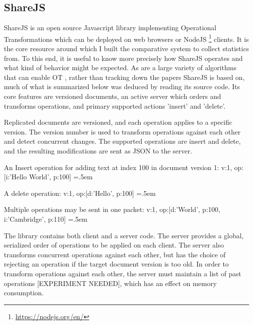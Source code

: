 \documentclass[12pt,a4paper,twoside,openright]{report}
\newenvironment{lcverbatim}
 {\SaveVerbatim{cverb}}
 {\endSaveVerbatim
  \flushleft\fboxrule=0pt\fboxsep=.5em
  \colorbox{cverbbg}{%
    \makebox[\dimexpr\linewidth-2\fboxsep][l]{\BUseVerbatim{cverb}}%
  }
  \endflushleft
}
\begin{document}
	\subsection{ShareJS}
	
	ShareJS \cite{sharejs} is an open source Javascript library implementing Operational Transformations which can be deployed on web browsers or NodeJS \footnote{\url{https://nodejs.org/en/}} clients. It is the core resource around which I built the comparative system to collect statistics from. To this end, it is useful to know more precisely how ShareJS operates and what kind of behavior might be expected. As are a large variety of algorithms that can enable OT \cite{kumawat2016}, rather than tracking down the papers ShareJS is based on, much of what is summarized below was deduced by reading its source code. Its core features are versioned documents, an active server which orders and transforms operations, and primary supported actions 'insert' and 'delete'.
	
	Replicated documents are versioned, and each operation applies to a specific version. The version number is used to transform operations against each other and detect concurrent changes. The supported operations are insert and delete, and the resulting modifications are sent as JSON to the server.
	
	An Insert operation for adding text at index 100 in document version 1:
\begin{lcverbatim}
{v:1, op:[{i:'Hello World', p:100}]}
\end{lcverbatim}

	A delete operation:
\begin{lcverbatim}
{v:1, op:[{d:'Hello', p:100}]}
\end{lcverbatim}

	Multiple operations may be sent in one packet:
\begin{lcverbatim}
{v:1, op:[{d:'World', p:100}, {i:'Cambridge', p:110}]}
\end{lcverbatim}

\vspace{5mm}

	The library contains both client and a server code. The server provides a global, serialized order of operations to be applied on each client. The server also transforms concurrent operations against each other, but has the choice of rejecting an operation if the target document version is too old. In order to transform operations against each other, the server must maintain a list of past operations [EXPERIMENT NEEDED], which has an effect on memory consumption.
	
\end{document}
